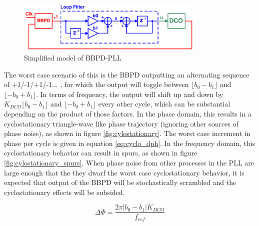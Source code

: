 		\begin{figure}
			\center\includegraphics[width=0.8\textwidth, angle=0]{./figs/design/simplified_bbpll}
			\caption{Simplified model of BBPD-PLL}
			\label{fig:simp_bbpdpll}
		\end{figure}
		The worst case scenario of this is the BBPD outputting an alternating sequence of +1/-1/+1/-1... , for which the output will toggle between $\lfloor b_0-b_1 \rfloor$ and $\lfloor -b_0+b_1 \rfloor$. In terms of frequency, the output will shift up and down by $K_{DCO}\lfloor b_0-b_1 \rfloor$ and $\lfloor -b_0+b_1 \rfloor$ every other cycle, which can be substantial depending on the product of those factors. In the phase domain, this results in a cyclostationary triangle-wave like phase trajectory (ignoring other sources of phase noise), as shown in figure \ref{fig:cylostationary}. The worst case increment in phase per cycle is given in equation \ref{eq:cyclo_dph}. In the frequency domain, this cyclostationary behavior can result in spurs, as shown in figure \ref{fig:cylostationary_spurs}. When phase noise from other processes in the PLL are large enough that the they dwarf the worst case cyclostationary behavior, it is expected that output of the BBPD will be stochastically scrambled and the cyclostationary effects will be subsided. 

		\begin{equation}\label{eq:cyclo_dph}
			\Delta \Phi = \frac{2\pi|b_0-b_1|K_{DCO}}{f_{ref}}
		\end{equation}

